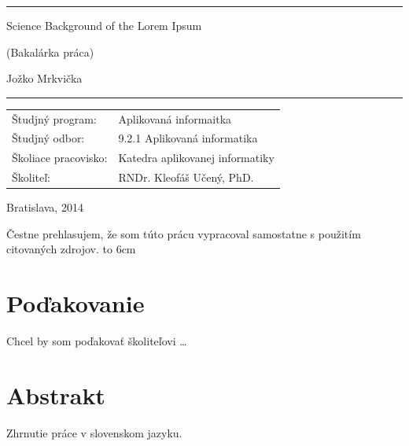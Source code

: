 \documentclass[12pt,oneside,a4paper]{book}
\def\title{Science Background of the Lorem Ipsum}
\def\thesis{Bakalárka práca}
\def\author{Jožko Mrkvička}
\def\year{2014}
\def\placeandyear{Bratislava, \year}
\def\supervisor{RNDr. Kleofáš Učený, PhD.\ }
\def\studyprogramme{Aplikovaná informaitka}
\def\studyfield{9.2.1 Aplikovaná informatika}
\def\department{Katedra aplikovanej informatiky}
\begin{document}
\vfill
\begin{center}
\begin{minipage}{0.8\textwidth}
\hrule
\bigskip\bigskip
\begin{center}
{\LARGE\sc \title}
\end{center}
\smallskip
\centerline{(\thesis)}
\bigskip
\bigskip
\centerline{\large\sc \author}
\bigskip\bigskip
\hrule
\end{minipage}
\end{center}

\vfill
\begin{flushleft}
  \begin{tabular}{@{}ll}
    Študjný program: & \studyprogramme \\
    Študjný odbor: & \studyfield \\
    Školiace pracovisko: & \department \\
    Školiteľ: & \supervisor
  \end{tabular}
  \vspace{1cm}

  \placeandyear\\
\end{flushleft}

\newpage
\begin{minipage}{1.00\textwidth}
\vspace{15.6cm}
Čestne prehlasujem, že som túto prácu vypracoval samostatne s použitím citovaných
zdrojov.
\hfill\hbox to 6cm{\dotfill}
\end{minipage}

\newpage
\chapter*{Poďakovanie}
\vfil
Chcel by som poďakovať školiteľovi \ldots

\chapter*{Abstrakt}
Zhrnutie práce v slovenskom jazyku.
\end{document}
